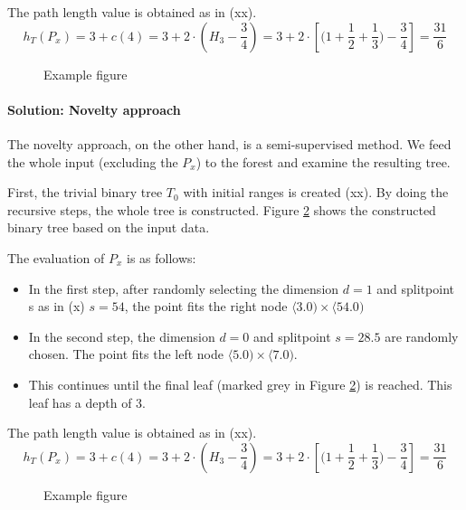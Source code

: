 
The path length value is obtained as in (xx).
$$h_T(P_x) = 3 + c(4) = 3+ 2 \cdot (H_3 - \frac{3}{4}) = 3 +2 \cdot [\bigl(1 + \frac{1}{2} + \frac{1}{3}\bigr) - \frac{3}{4}] = \frac{31}{6}$$



\begin{figure}[htbp]
\centering

\caption{Example figure}
\label{fig:example_noutlier_tree_color}
\end{figure}



\paragraph{Solution: Novelty approach}

The novelty approach, on the other hand, is a semi-supervised method. We feed the whole input (excluding the $P_x$) to the forest and examine the resulting tree.

First, the trivial binary tree $T_0$ with initial ranges is created (xx).
By doing the recursive steps, the whole tree is constructed.
Figure \ref{fig:example_novelty_tree_color} shows the constructed binary tree based on the input data.

The evaluation of $P_x$ is as follows:
\begin{itemize}
    \item In the first step, after randomly selecting the dimension $d=1$ and splitpoint s as in (x) $s = 54$, the point fits the right node $\langle 3.0 ) \times \langle 54.0)$
    \item In the second step, the dimension $d=0$ and splitpoint $s = 28.5$ are randomly chosen. The point fits the left node $\langle 5.0 ) \times \langle 7.0)$.
    \item This continues until the final leaf (marked grey in Figure \ref{fig:example_novelty_tree_color}) is reached. This leaf has a depth of 3.
    
\end{itemize}


The path length value is obtained as in (xx).
$$h_T(P_x) = 3 + c(4) = 3+ 2 \cdot (H_3 - \frac{3}{4}) = 3 +2 \cdot [\bigl(1 + \frac{1}{2} + \frac{1}{3}\bigr) - \frac{3}{4}] = \frac{31}{6}$$



\begin{figure}[htbp]
\centering

\caption{Example figure}
\label{fig:example_novelty_tree_color}
\end{figure}
